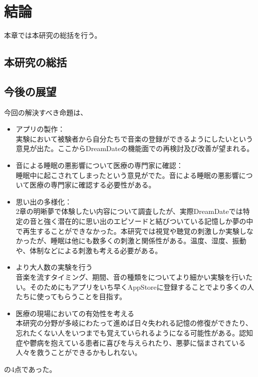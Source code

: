 \chapter{結論}
\label{chap:result}

本章では本研究の総括を行う。

\section{本研究の総括}
\section{今後の展望}
今回の解決すべき命題は、
\begin{itemize}
\item アプリの製作：\\
実験において被験者から自分たちで音楽の登録ができるようにしたいという意見が出た。ここからDreamDateの機能面での再検討及び改善が望まれる。

\item 音による睡眠の悪影響について医療の専門家に確認：\\
睡眠中に起こされてしまったという意見がでた。音による睡眠の悪影響について医療の専門家に確認する必要性がある。

\item 思い出の多様化：\\
2章の明晰夢で体験したい内容について調査したが、実際DreamDateでは特定の音と強く潜在的に思い出のエピソードと結びついている記憶しか夢の中で再生することができなかった。本研究では視覚や聴覚の刺激しか実験しなかったが、睡眠は他にも数多くの刺激と関係性がある。温度、湿度、振動や、体制などによる刺激も考える必要がある。

\item より大人数の実験を行う\\
音楽を流すタイミング、期間、音の種類をについてより細かい実験を行いたい。そのためにもアプリをいち早くAppStoreに登録することでより多くの人たちに使ってもらうことを目指す。

\item 医療の現場においての有効性を考える\\
本研究の分野が多岐にわたって進めば日々失われる記憶の修復ができたり、忘れたくない人をいつまでも覚えていられるようになる可能性がある。認知症や鬱病を抱えている患者に喜びを与えられたり、悪夢に悩まされている人々を救うことができるかもしれない。

\end{itemize}

の4点であった。